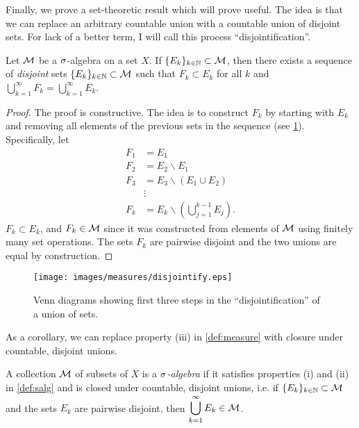 \documentclass[main.tex]{subfiles}
\begin{document}
Finally, we prove a set-theoretic result which will prove useful. The idea is that we can replace an arbitrary countable union with a countable union of disjoint sets. For lack of a better term, I will call this process ``disjointification''.

\begin{proposition}[Disjointification]\label{prop:disjointify}
Let ${\mathcal M}$ be a ${\sigma}$-algebra on a set $X$. If $\{ E_k\}_{k \in {\mathbb N}} \subset {\mathcal M}$, then there exists a sequence of \emph{disjoint} sets $\{ E_k\}_{k \in {\mathbb N}} \subset {\mathcal M}$ such that $F_k \subset E_k$ for all $k$ and $\bigcup_{k=1}^\infty F_k = \bigcup_{k=1}^\infty E_k$.
\begin{proof}
The proof is constructive. The idea is to construct $F_k$ by starting with $E_k$ and removing all elements of the previous sets in the sequence (see \cref{fig:disjointify}). Specifically, let 
\begin{align*}
F_1 &= E_1 \\
F_2 &= E_2 \backslash E_1 \\
F_3 &= E_3 \backslash (E_1 \cup E_2) \\
&\vdots \\
F_k &= E_k \backslash \left( \bigcup_{j=1}^{k-1} E_j \right).
\end{align*}
$F_k \subset E_k$, and $F_k \in {\mathcal M}$ since it was constructed from elements of ${\mathcal M}$ using finitely many set operations. The sets $F_k$ are pairwise disjoint and the two unions are equal by construction.
\end{proof}
\end{proposition}

\begin{figure}
\centerline{\texttt{[image: images/measures/disjointify.eps]}}
\caption{Venn diagrams showing first three steps in the ``disjointification'' of a union of sets.}
\label{fig:disjointify}
\end{figure}

As a corollary, we can replace property (iii) in \cref{def:measure} with closure under countable, disjoint unions.

\begin{corollary}\label{corr:salgdisjointunion}
A collection ${\mathcal M}$ of subsets of $X$ is a \emph{${\sigma}$-algebra} if it satisfies properties (i) and (ii) in \cref{def:salg} and is closed under countable, disjoint unions, i.e. if $\{E_k\}_{k \in {\mathbb N}} \subset {\mathcal M}$ and the sets $E_k$ are pairwise disjoint, then $\begin{aligned}\bigcup_{k=1}^\infty E_k \in {\mathcal M} \end{aligned}$.
\end{corollary}
\end{document}
